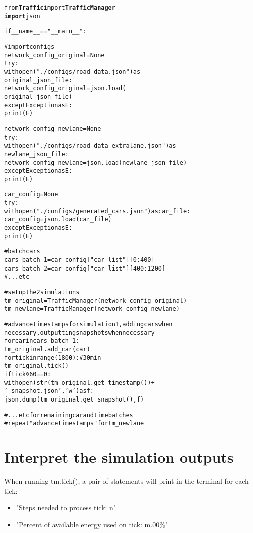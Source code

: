 \begin{alltt}
from \textbf{Traffic} import \textbf{TrafficManager}
\textbf{import} json

if __name__ == "__main__":

    # import configs
    network_config_original = None
    try:
        with open("./configs/road_data.json") as 
                  original_json_file: 
            network_config_original = json.load(
                                      original_json_file)
    except Exception as E:
        print(E)
        
    network_config_newlane = None
    try:
        with open("./configs/road_data_extralane.json") as 
                  newlane_json_file: 
            network_config_newlane = json.load(newlane_json_file)
    except Exception as E:
        print(E)

    car_config = None
    try:
        with open("./configs/generated_cars.json") as car_file:  
            car_config = json.load(car_file)
    except Exception as E:
        print(E)
        
    # batch cars
    cars_batch_1 = car_config["car_list"][0:400]
    cars_batch_2 = car_config["car_list"][400:1200]
    # ...etc
    
    # set up the 2 simulations
    tm_original = TrafficManager(network_config_original)
    tm_newlane = TrafficManager(network_config_newlane)
    
    # advance timestamps for simulation 1, adding cars when 
           necessary, outputting snapshots when necessary
    for car in cars_batch_1:
        tm_original.add_car(car)
    for tick in range(1800):     # 30 min
        tm_original.tick()
        if tick \% 60 == 0:
            with open(str(tm_original.get_timestamp()) + 
                          '_snapshot.json', 'w') as f:
                json.dump(tm_original.get_snapshot(), f)
    
    # ...etc for remaining car and time batches
    #  repeat "advance timestamps" for tm_newlane
\end{alltt}


\section{Interpret the simulation outputs}

\par When running tm.tick(), a pair of statements will print in the terminal for each tick:

\begin{itemize}
    \item "Steps needed to process tick:  n"
    \item "Percent of available energy used on tick:  m.00\%"
\end{itemize}


